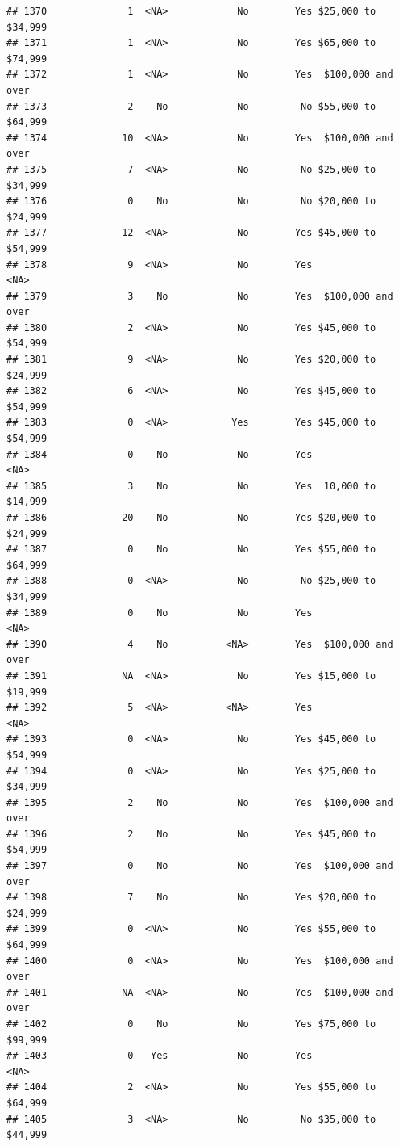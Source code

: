 \documentclass[man]{apa6}
\begin{document}
\begin{verbatim}
## 1370              1  <NA>            No        Yes $25,000 to $34,999
## 1371              1  <NA>            No        Yes $65,000 to $74,999
## 1372              1  <NA>            No        Yes  $100,000 and over
## 1373              2    No            No         No $55,000 to $64,999
## 1374             10  <NA>            No        Yes  $100,000 and over
## 1375              7  <NA>            No         No $25,000 to $34,999
## 1376              0    No            No         No $20,000 to $24,999
## 1377             12  <NA>            No        Yes $45,000 to $54,999
## 1378              9  <NA>            No        Yes               <NA>
## 1379              3    No            No        Yes  $100,000 and over
## 1380              2  <NA>            No        Yes $45,000 to $54,999
## 1381              9  <NA>            No        Yes $20,000 to $24,999
## 1382              6  <NA>            No        Yes $45,000 to $54,999
## 1383              0  <NA>           Yes        Yes $45,000 to $54,999
## 1384              0    No            No        Yes               <NA>
## 1385              3    No            No        Yes  10,000 to $14,999
## 1386             20    No            No        Yes $20,000 to $24,999
## 1387              0    No            No        Yes $55,000 to $64,999
## 1388              0  <NA>            No         No $25,000 to $34,999
## 1389              0    No            No        Yes               <NA>
## 1390              4    No          <NA>        Yes  $100,000 and over
## 1391             NA  <NA>            No        Yes $15,000 to $19,999
## 1392              5  <NA>          <NA>        Yes               <NA>
## 1393              0  <NA>            No        Yes $45,000 to $54,999
## 1394              0  <NA>            No        Yes $25,000 to $34,999
## 1395              2    No            No        Yes  $100,000 and over
## 1396              2    No            No        Yes $45,000 to $54,999
## 1397              0    No            No        Yes  $100,000 and over
## 1398              7    No            No        Yes $20,000 to $24,999
## 1399              0  <NA>            No        Yes $55,000 to $64,999
## 1400              0  <NA>            No        Yes  $100,000 and over
## 1401             NA  <NA>            No        Yes  $100,000 and over
## 1402              0    No            No        Yes $75,000 to $99,999
## 1403              0   Yes            No        Yes               <NA>
## 1404              2  <NA>            No        Yes $55,000 to $64,999
## 1405              3  <NA>            No         No $35,000 to $44,999

\end{verbatim}
\end{document}

